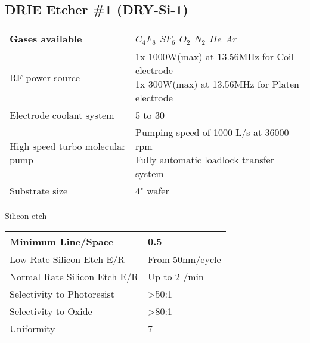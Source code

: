 \subsection{DRIE Etcher \#1 (DRY-Si-1)}\label{dry_DRIE_etcher}
\WaferClean

\begin{minipage}[H]{\MachinePictureMiniPageWidth}
\end{minipage}\begin{minipage}[H]{\MachineTextMiniPageWidth}
	\begin{tabular}{|p{3cm}|p{8cm}|}
		\hline
		Gases available
		&
		\makecell[l]{
			\tabitem $C_4 F_8$ \\
			\tabitem $S F_6$ \\
			\tabitem $O_2$ \\
			\tabitem $N_2$ \\
			\tabitem  $He$ \\
			\tabitem $Ar$
		} \\
		\hline
		RF power source
		&
		\makecell[l]{
			\tabitem 1x 1000W(max) at 13.56MHz for Coil electrode \\
			\tabitem 1x 300W(max) at 13.56MHz for Platen electrode
		} \\
		\hline
		Electrode coolant system
		&
		5 to 30 \degreesC \\
		\hline
		High speed turbo molecular pump
		&
		\makecell[l]{
			\tabitem Pumping speed of 1000 L/s at 36000 rpm \\
			\tabitem Fully automatic loadlock transfer system
		} \\
		\hline
		Substrate size
		&
		4" wafer \\
		\hline
	\end{tabular}

	\underline{Silicon etch}

	\begin{tabular}{|p{5cm}|p{6cm}|}
		\hline
		Minimum Line/Space
		&
		0.5 \um
		\\
		\hline
		Low Rate Silicon Etch E/R
		&
		From 50nm/cycle \\
		\hline
		Normal Rate Silicon Etch E/R
		&
		Up to 2 \um/min\\
		\hline
		Selectivity to Photoresist
		&
		>50:1 \\
		\hline
		Selectivity to Oxide
		&
		>80:1 \\
		\hline
		Uniformity
		&
		7\percent \\
		\hline
	\end{tabular}
\end{minipage}
